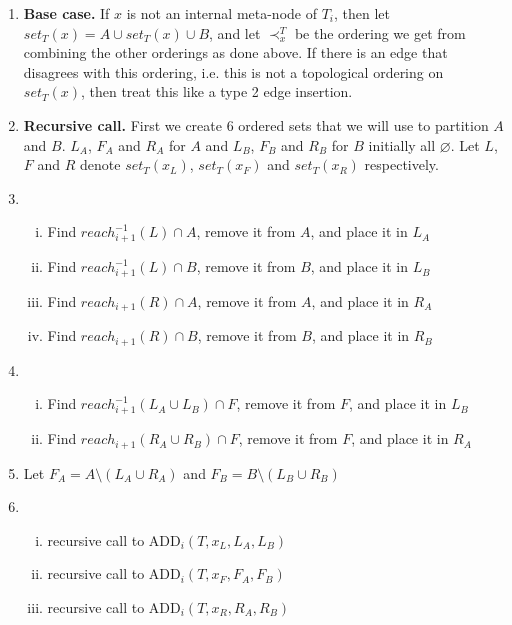 \documentclass{article}
\begin{document}
\begin{enumerate}
    \item \textbf{Base case.} If $x$ is not an internal meta-node of $T_{i}$, then let $set_{T}(x)=A\cup set_{T}(x)\cup B$, and let $\prec_{x}^{T}$ be the ordering we get from combining the other orderings as done above. If there is an edge that disagrees with this ordering, i.e. this is not a topological ordering on $set_{T}(x)$, then treat this like a type 2 edge insertion.
    \item \textbf{Recursive call.} First we create 6 ordered sets that we will use to partition $A$ and $B$. $L_{A}$, $F_{A}$ and $R_{A}$ for $A$ and $L_{B}$, $F_{B}$ and $R_{B}$ for $B$ initially all $\varnothing$. Let $L$, $F$ and $R$ denote $set_{T}(x_{L})$, $set_{T}(x_{F})$ and $set_{T}(x_{R})$ respectively.
    \item \begin{enumerate}[i.]
        \item Find $reach_{i+1}^{-1}(L) \cap A$, remove it from $A$, and place it in $L_{A}$
        \item Find $reach_{i+1}^{-1}(L) \cap B$, remove it from $B$, and place it in $L_{B}$
        \item Find $reach_{i+1}(R) \cap A$, remove it from $A$, and place it in $R_{A}$
        \item Find $reach_{i+1}(R) \cap B$, remove it from $B$, and place it in $R_{B}$
        \end{enumerate}
    \item \begin{enumerate}[i.]
        \item Find $reach_{i+1}^{-1}(L_{A} \cup L_{B}) \cap F$, remove it from $F$, and place it in $L_{B}$
        \item Find $reach_{i+1}(R_{A} \cup R_{B}) \cap F$, remove it from $F$, and place it in $R_{A}$
        \end{enumerate}
    \item Let $F_{A}=A \setminus (L_{A} \cup R_{A})$ and $F_{B}=B \setminus (L_{B} \cup R_{B})$
    \item \begin{enumerate}[i.]
        \item recursive call to ADD$_{i}(T,x_{L},L_{A},L_{B})$
        \item recursive call to ADD$_{i}(T,x_{F},F_{A},F_{B})$
        \item recursive call to ADD$_{i}(T,x_{R},R_{A},R_{B})$
        \end{enumerate}
\end{enumerate}
\end{document}
